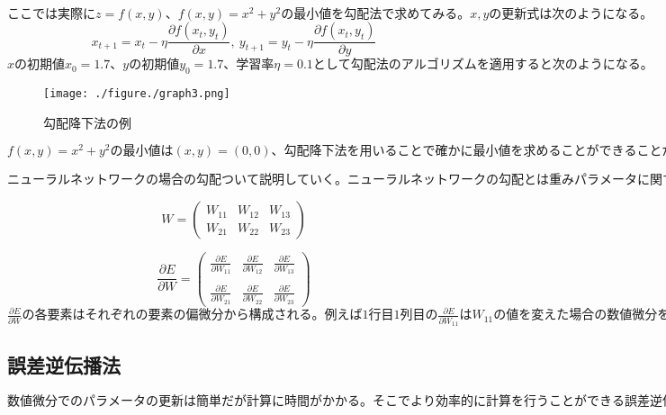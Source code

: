 $ここでは実際にz=f(x,y)、f(x,y)=x^2+y^2の最小値を勾配法で求めてみる。
x,yの更新式は次のようになる。$
\begin{equation}
x_{t+1} =x_t - \eta \frac{\partial f(x_t,y_t)}{\partial x},\ 
y_{t+1} =y_t - \eta \frac{\partial f(x_t,y_t)}{\partial y}
\end{equation}
$xの初期値x_0=1.7、yの初期値y_0=1.7、学習率\eta = 0.1として勾配法のアルゴリズムを適用すると次のようになる。$

\begin{figure}[h]
\begin{center}
\texttt{[image: ./figure./graph3.png]}
\end{center}
\caption{勾配降下法の例}
\end{figure}

$f(x,y) = x^2 + y^2の最小値は(x,y)=(0,0)、勾配降下法を用いることで確かに最小値を求めることができることがわかる。$

$ニューラルネットワークの場合の勾配ついて説明していく。ニューラルネットワークの勾配とは重みパラメータに関する損失関数の勾配である。例えば2×3の重みWをもつニューラルネットワークの場合を考える。この時損失関数に対する各重みの勾配\frac{\partial E}{\partial W}は図のようになる。$

\[
  W = \left(
    \begin{array}{ccc}
      W_{11} & W_{12} & W_{13} \\
      W_{21} & W_{22} & W_{23} 
    \end{array}
  \right)
\]

\[
  \frac{\partial E}{\partial W} = \left(
    \begin{array}{ccc}
     \frac{\partial E}{\partial W_{11}} & \frac{\partial E}{\partial W_{12}} & \frac{\partial E}{\partial W_{13}} \\
\\
      \frac{\partial E}{\partial W_{21}} & \frac{\partial E}{\partial W_{22}} & \frac{\partial E}{\partial W_{23}} 
    \end{array}
  \right)
\]
$\frac{\partial E}{\partial W}の各要素はそれぞれの要素の偏微分から構成される。例えば1行目1列目の\frac{\partial E}{\partial W_{11}}はW_{11}の値を変えた場合の数値微分を求めパラメータを更新する。これを各パラメータに対して行う。$

\begin{flushright}
\end{flushright}

\subsection{誤差逆伝播法}
$数値微分でのパラメータの更新は簡単だが計算に時間がかかる。そこでより効率的に計算を行うことができる誤差逆伝播法について説明する。
誤差逆伝播法はニューラルネットワークの出力から損失関数の微分値を入力側へ伝えていく。そうすることで一度の実行で損失関数の各層に対する微分を求めることができるようになる。数値微分と誤差逆伝播法の計算量の違いを比較する。$

